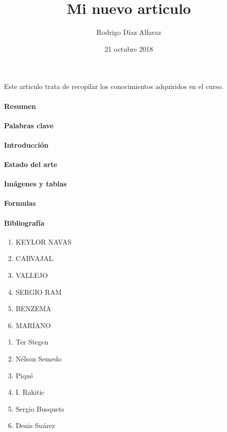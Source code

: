 \documentclass[a4paper,11pt]{article}
\begin{document}
\title{Mi nuevo articulo} 
\author{Rodrigo Díaz Alfaraz}
\date{21 octubre 2018}
\maketitle

\abstractname{Este articulo trata de recopilar los conocimientos adquiridos en el curso. }

\paragraph*{Resumen}

\paragraph*{Palabras clave}
\paragraph*{Introducción}
\paragraph*{Estado del arte}
\paragraph*{Imágenes y tablas}
\paragraph*{Formulas}
\paragraph*{Bibliografía}



\begin{minipage}[b]{0.45\linewidth} 
\begin{enumerate}
\item KEYLOR NAVAS
\item CARVAJAL
\item VALLEJO
\item SERGIO RAM
\item BENZEMA
\item MARIANO
\end{enumerate}
\end{minipage} 
\begin{minipage}[b]{0.45\linewidth} 
\begin{enumerate}
\item Ter Stegen
\item Nélson Semedo
\item Piqué
\item I. Rakitic
\item Sergio Busquets
\item Denis Suárez
\end{enumerate}
\end{minipage}
\end{document}
